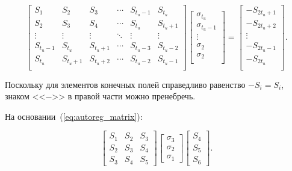 \begin{equation}
  \label{eq:autoreg_matrix}
  \begin{bmatrix}
    S_1 & S_2 & S_3 & \cdots & S_{t_u-1} & S_{t_u}\\
    S_2 & S_3 & S_4 & \cdots & S_{t_u} & S_{t_u+1}\\
    \vdots & \vdots & \vdots  & \ddots & \vdots & \vdots \\
    S_{t_u-1} & S_{t_u} &  S_{t_u+1} & \cdots  & S_{t_u-3} & S_{t_u-2}\\
    S_{t_u} & S_{t_u+1} &  S_{t_u+2} & \cdots  & S_{t_u-2} & S_{t_u-1}\\
  \end{bmatrix}
  \begin{bmatrix}
    \sigma_{t_u}\\
    \sigma_{t_u-1}\\
    \vdots\\
    \sigma_{2}\\
    \sigma_{2}\\
  \end{bmatrix}
  = \begin{bmatrix}
    -S_{2t_u+1}\\
    -S_{2t_u+2}\\
    \vdots\\
    -S_{2t_u-1}\\
    -S_{2t_u}\\
  \end{bmatrix}.
\end{equation}

Поскольку для элементов конечных полей справедливо равенство $-S_i =
S_i$, знаком <<$-$>> в правой части можно пренебречь.

На основании~(\ref{eq:autoreg_matrix}):

\begin{equation}
  \label{eq:my_autoreg_matrix}
  \begin{bmatrix}
    S_1 & S_2 & S_3 \\
    S_2 & S_3 & S_4 \\
    S_3 & S_4 & S_5
  \end{bmatrix}
  \begin{bmatrix}
    \sigma_3\\
    \sigma_2\\
    \sigma_1
  \end{bmatrix}
  \begin{bmatrix}
    S_4\\
    S_5\\
    S_6
  \end{bmatrix}.
\end{equation}

